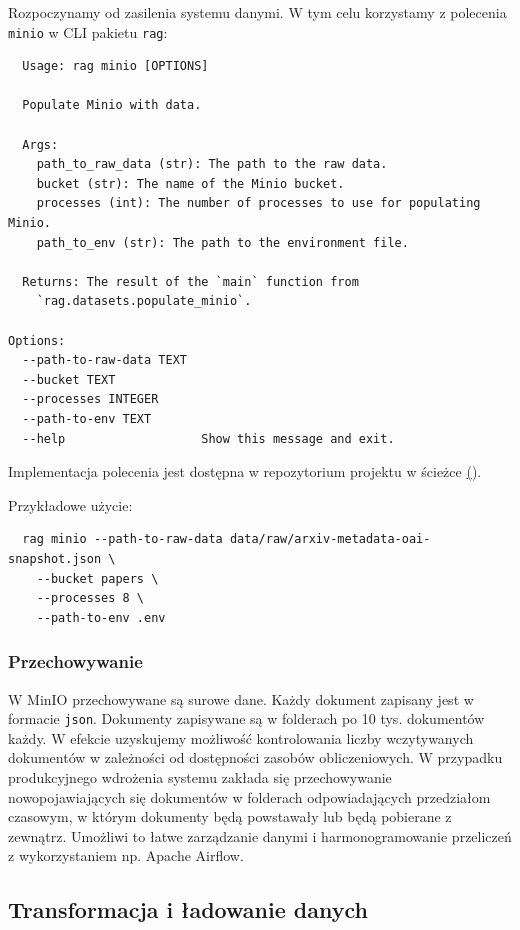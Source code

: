 \documentclass[10pt]{article}
\begin{document}
Rozpoczynamy od zasilenia systemu danymi. W tym celu korzystamy z polecenia \texttt{minio} w CLI pakietu \texttt{rag}:
\begin{lstlisting}
  Usage: rag minio [OPTIONS]

  Populate Minio with data.

  Args:
    path_to_raw_data (str): The path to the raw data.
    bucket (str): The name of the Minio bucket.
    processes (int): The number of processes to use for populating Minio.
    path_to_env (str): The path to the environment file.

  Returns: The result of the `main` function from 
    `rag.datasets.populate_minio`.

Options:
  --path-to-raw-data TEXT
  --bucket TEXT
  --processes INTEGER
  --path-to-env TEXT
  --help                   Show this message and exit.
\end{lstlisting}

Implementacja polecenia jest dostępna w repozytorium projektu w ścieżce \href{https://github.com/stasulam/pw-big-data-thesis-public/blob/main/src/rag/datasets/populate_minio.py}().

Przykładowe użycie:
\begin{lstlisting}
  rag minio --path-to-raw-data data/raw/arxiv-metadata-oai-snapshot.json \
    --bucket papers \
    --processes 8 \
    --path-to-env .env
\end{lstlisting}

\subsubsection{Przechowywanie}

W MinIO przechowywane są surowe dane. Każdy dokument zapisany jest w formacie \texttt{json}. Dokumenty zapisywane są w folderach po 10 tys. dokumentów każdy. W efekcie uzyskujemy możliwość kontrolowania liczby wczytywanych dokumentów w zależności od dostępności zasobów obliczeniowych. W przypadku produkcyjnego wdrożenia systemu zakłada się przechowywanie nowopojawiających się dokumentów w folderach odpowiadających przedziałom czasowym, w którym dokumenty będą powstawały lub będą pobierane z zewnątrz. Umożliwi to łatwe zarządzanie danymi i harmonogramowanie przeliczeń z wykorzystaniem np. Apache Airflow.

\subsection{Transformacja i ładowanie danych}
\end{document}
